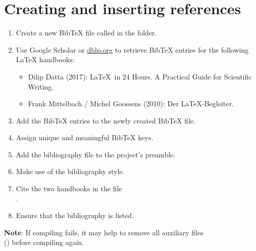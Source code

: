 \section{Creating and inserting references}

\begin{enumerate}
  \item Create a new Bib\TeX{} file called  in the  folder.
  \item Use Google Scholar or \url{dblp.org} to retrieve Bib\TeX{} entries for the following \LaTeX{}
  handbooks:
  \begin{itemize}
    \item Dilip Datta (2017): \LaTeX\ in 24 Hours. A Practical Guide for Scientific Writing.
    \item Frank Mittelbach / Michel Goossens (2010): Der \LaTeX-Begleiter.
  \end{itemize}
  \item Add the Bib\TeX{} entries to the newly created Bib\TeX{} file.
  \item Assign unique and meaningful Bib\TeX{} keys.
  \item Add the bibliography file to the project's preamble.
  \item Make use of the  bibliography style.
  \item Cite the two handbooks in the file\\.
  \item Ensure that the bibliography is listed.
\end{enumerate}

\noindent \textbf{Note}: If compiling fails, it may help to remove all auxiliary files \\() before compiling again.